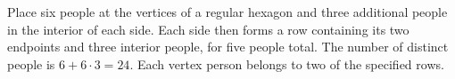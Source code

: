 Place six people at the vertices of a regular hexagon and three additional people in the interior of each side. Each side then forms a row containing its two endpoints and three interior people, for five people total. The number of distinct people is $6+6\cdot3=\boxed{24}$. Each vertex person belongs to two of the specified rows.
